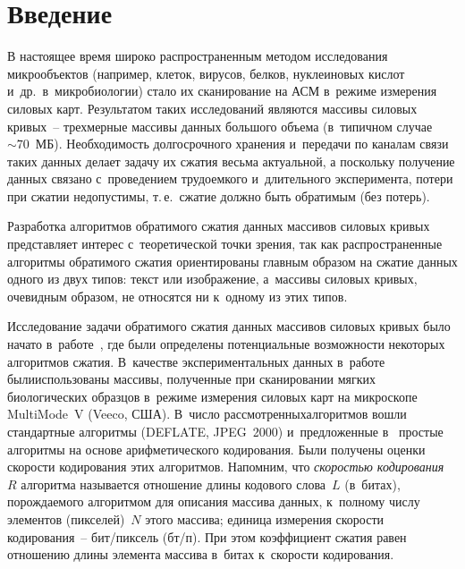 

\vspace*{4pt}



\thispagestyle{headings}

\begin{multicols}{2}

\label{st\stat}

\section{Введение}

\vspace*{-4pt}

В настоящее время широко распространенным методом исследования микрообъектов (например, клеток,
 вирусов, белков, нуклеиновых кислот и~др.\ в~микробиологии) стало их сканирование на 
АСМ в~режиме измерения силовых карт. Результатом таких 
 исследований являются массивы силовых кривых~-- трехмерные массивы данных большого объема 
 (в~типичном случае $\sim70$~МБ). Необходимость долгосрочного хранения и~передачи по каналам 
 связи таких данных делает задачу их сжатия весьма актуальной, а поскольку получение данных 
 связано с~проведением трудоемкого и~длительного эксперимента, потери при сжатии недопустимы, т.\,е.\
  сжатие должно быть обратимым (без потерь).

Разработка алгоритмов обратимого сжатия данных массивов силовых кривых представляет 
интерес с~теоретической точки зрения, так как распространенные алгоритмы обратимого 
сжатия \mbox{ориентированы} главным образом на сжатие данных одного из двух типов: текст 
или изображение, а~массивы силовых кривых, очевидным образом, не относятся ни к~одному из этих типов.

Исследование задачи обратимого сжатия данных массивов силовых кривых было начато в~работе~\cite{b1}, 
где были определены потенциальные возможности некоторых алгоритмов сжатия. 
В~качестве экспериментальных данных в~работе были\linebreak использованы массивы, полученные при 
сканировании мягких биологических образцов в~режиме измерения силовых карт на микроскопе MultiMode~V 
(Veeco, США). В~число рассмотренных\linebreak алгоритмов вошли стандартные алгоритмы (\mbox{DEFLATE}, JPEG~2000) 
и~предложенные в~\cite{b1} простые алгоритмы на основе арифметического кодирования. 
Были получены оценки скорости кодирования этих алгоритмов. Напомним, что 
\textit{ско\-ростью кодирования}~$R$ алгоритма называется отношение длины кодового слова~$L$ 
(в~битах), порождаемого алгоритмом для описания массива данных, к~полному числу элементов 
(пикселей)~$N$ этого массива; единица измерения скорости кодирования~-- бит/пик\-сель (бт/п). 
При этом коэффициент сжатия равен отношению длины элемента массива в~битах к~ско\-рости кодирования.


\end{multicols}
